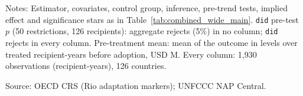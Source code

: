 \begin{table}[H]
\centering
\caption{Effect of NAP adoption on climate finance: simple ATT across outcomes (heterogeneity by donor type; cohorts $\geq 5$ units, DR estimator)}
\label{tab:het_donor_wide}
\begingroup\small
{}
\endgroup
\par\vspace{4pt}
\begin{minipage}{\linewidth}\footnotesize
Notes: Estimator, covariates, control group, inference, pre-trend tests, implied effect and significance stars as in Table~\ref{tab:combined_wide_main}. \texttt{did} pre-test $p$ (50 restrictions, 126 recipients): aggregate rejects (5\%) in no column; \texttt{did} rejects in every column. Pre-treatment mean: mean of the outcome in levels over treated recipient-years before adoption, USD M. Every column: 1,930 observations (recipient-years), 126 countries.\par
Source: OECD CRS (Rio adaptation markers); UNFCCC NAP Central.
\end{minipage}
\end{table}
